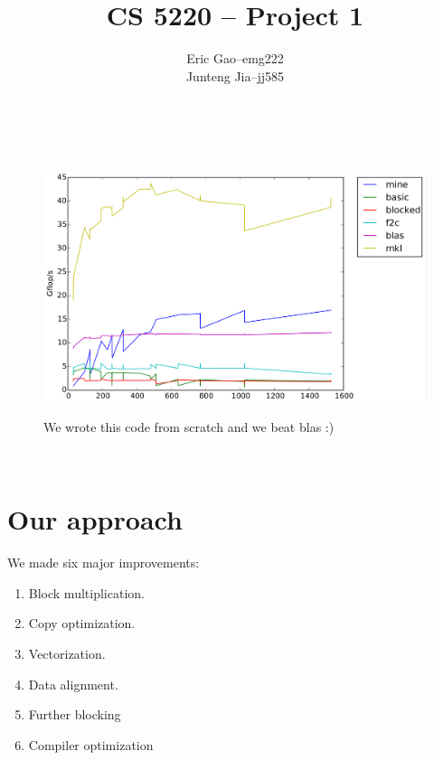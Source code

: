 \documentclass[11pt]{article}
\title{CS 5220 -- Project 1} %
\author{
  \begin{tabular}{l c l}
    Eric Gao & -- & emg222\\
    Junteng Jia & -- & jj585
  \end{tabular}\\
  \rule{\linewidth}{0.4pt}
}
\date{}
\begin{document}
    \thispagestyle{empty}
    \maketitle

	\vspace{1cm}

    \begin{figure}[H]
        \centering
        \includegraphics[width=6.5in]{timing_vector_32_64_cc_cp_align.png}
        
        \begin{center}
		We wrote this code from scratch and we beat blas :)         
		\end{center}
    \end{figure}


	\clearpage

	\tableofcontents\

    \pagebreak
    \section{Our approach}
    We made six major improvements:
     \begin{enumerate}
	     	\item Block multiplication.
           	\item Copy optimization.
           	\item Vectorization.
	        \item Data alignment.
	     	\item Further blocking
		    \item Compiler optimization
     \end{enumerate}
    
	    \vspace{1cm}
	    		
\end{document}
